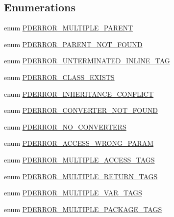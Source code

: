 \subsection*{\-Enumerations}
\begin{DoxyCompactItemize}
\item 
enum \hyperlink{_errors_8inc_aa4067eef2227b444cee399368374b6cf}{\-P\-D\-E\-R\-R\-O\-R\-\_\-\-M\-U\-L\-T\-I\-P\-L\-E\-\_\-\-P\-A\-R\-E\-N\-T} 
\item 
enum \hyperlink{_errors_8inc_a51e1256b59c63d6f00a00c4f13b90b90}{\-P\-D\-E\-R\-R\-O\-R\-\_\-\-P\-A\-R\-E\-N\-T\-\_\-\-N\-O\-T\-\_\-\-F\-O\-U\-N\-D} 
\item 
enum \hyperlink{_errors_8inc_a0f4e5c19d4dfd85b890212ec62f6fc50}{\-P\-D\-E\-R\-R\-O\-R\-\_\-\-U\-N\-T\-E\-R\-M\-I\-N\-A\-T\-E\-D\-\_\-\-I\-N\-L\-I\-N\-E\-\_\-\-T\-A\-G} 
\item 
enum \hyperlink{_errors_8inc_a37a10c94823fc16ee66e678f9a9432fd}{\-P\-D\-E\-R\-R\-O\-R\-\_\-\-C\-L\-A\-S\-S\-\_\-\-E\-X\-I\-S\-T\-S} 
\item 
enum \hyperlink{_errors_8inc_af2cc70ac023fb34634f0ffc658f97a2d}{\-P\-D\-E\-R\-R\-O\-R\-\_\-\-I\-N\-H\-E\-R\-I\-T\-A\-N\-C\-E\-\_\-\-C\-O\-N\-F\-L\-I\-C\-T} 
\item 
enum \hyperlink{_errors_8inc_ae4c8dbc9922acf0f3868b75d2a2599fe}{\-P\-D\-E\-R\-R\-O\-R\-\_\-\-C\-O\-N\-V\-E\-R\-T\-E\-R\-\_\-\-N\-O\-T\-\_\-\-F\-O\-U\-N\-D} 
\item 
enum \hyperlink{_errors_8inc_a9578ca08d44f0e2b438af1aef95ec393}{\-P\-D\-E\-R\-R\-O\-R\-\_\-\-N\-O\-\_\-\-C\-O\-N\-V\-E\-R\-T\-E\-R\-S} 
\item 
enum \hyperlink{_errors_8inc_ad26a4e2f9ce8f06dd52bcc909de7cba1}{\-P\-D\-E\-R\-R\-O\-R\-\_\-\-A\-C\-C\-E\-S\-S\-\_\-\-W\-R\-O\-N\-G\-\_\-\-P\-A\-R\-A\-M} 
\item 
enum \hyperlink{_errors_8inc_a905fd557e0a5bf00aebe0112f416e878}{\-P\-D\-E\-R\-R\-O\-R\-\_\-\-M\-U\-L\-T\-I\-P\-L\-E\-\_\-\-A\-C\-C\-E\-S\-S\-\_\-\-T\-A\-G\-S} 
\item 
enum \hyperlink{_errors_8inc_a9c46abf67ed58a3331eb2117838a3213}{\-P\-D\-E\-R\-R\-O\-R\-\_\-\-M\-U\-L\-T\-I\-P\-L\-E\-\_\-\-R\-E\-T\-U\-R\-N\-\_\-\-T\-A\-G\-S} 
\item 
enum \hyperlink{_errors_8inc_aa2d2d7960751354ce39ad062a275bea2}{\-P\-D\-E\-R\-R\-O\-R\-\_\-\-M\-U\-L\-T\-I\-P\-L\-E\-\_\-\-V\-A\-R\-\_\-\-T\-A\-G\-S} 
\item 
enum \hyperlink{_errors_8inc_a557ee5be276ef9b25a20c5ad4da2e370}{\-P\-D\-E\-R\-R\-O\-R\-\_\-\-M\-U\-L\-T\-I\-P\-L\-E\-\_\-\-P\-A\-C\-K\-A\-G\-E\-\_\-\-T\-A\-G\-S} 

\end{DoxyCompactItemize}
